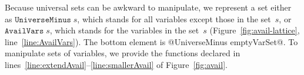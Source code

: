 \documentclass[blockstyle,preprint,natbib,nocopyrightspace]{sigplanconf}
\newcommand\lineref[1]{line~\ref{line:#1}}
\newcommand\linerangeref[2]{\mbox{lines~\ref{line:#1}--\ref{line:#2}}}
\def\authornote#1{\unskip\relax}
\newcommand{\john}[1]{\authornote{JD: #1}}
\newcommand\figref[1]{Figure~\ref{fig:#1}}
\begin{document}
Because universal sets can be awkward to manipulate, we represent a
set either as
$\mathtt{UniverseMinus}\;s$, which stands for all variables except
those in the set~$s$,
or $\mathtt{AvailVars}\;s$, which stands for the variables in the set~$s$
(\figref{avail-lattice}, \lineref{AvailVars}).
%
%
The bottom element is @UniverseMinus emptyVarSet@.
To manipulate sets of variables, we provide the functions declared in
\linerangeref{extendAvail}{smallerAvail} of \figref{avail}.









\end{document}
